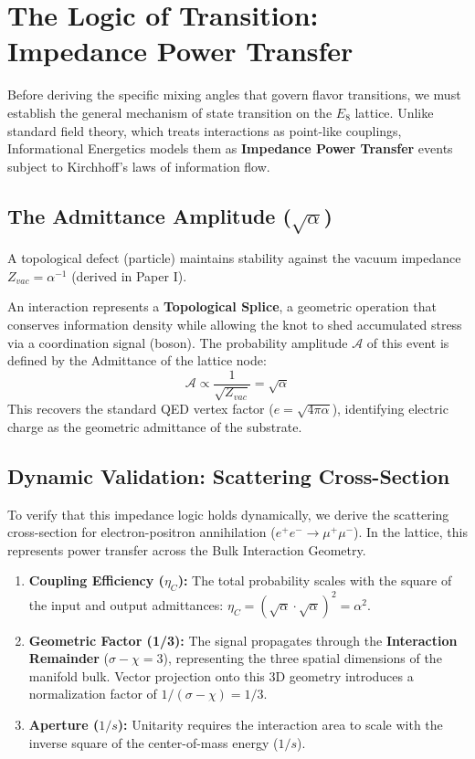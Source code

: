\section{The Logic of Transition: Impedance Power Transfer}

Before deriving the specific mixing angles that govern flavor transitions, we must establish the general mechanism of state transition on the $E_8$ lattice. Unlike standard field theory, which treats interactions as point-like couplings, Informational Energetics models them as \textbf{Impedance Power Transfer} events subject to Kirchhoff's laws of information flow.

\subsection{The Admittance Amplitude (\texorpdfstring{$\sqrt{\alpha}$}{sqrtalpha})}
A topological defect (particle) maintains stability against the vacuum impedance $Z_{vac} = \alpha^{-1}$ (derived in Paper I). 

An interaction represents a \textbf{Topological Splice}, a geometric operation that conserves information density while allowing the knot to shed accumulated stress via a coordination signal (boson). The probability amplitude $\mathcal{A}$ of this event is defined by the Admittance of the lattice node:
\begin{equation}
\mathcal{A} \propto \frac{1}{\sqrt{Z_{vac}}} = \sqrt{\alpha}
\end{equation}
This recovers the standard QED vertex factor ($e = \sqrt{4\pi\alpha}$), identifying electric charge as the geometric admittance of the substrate.

\subsection{Dynamic Validation: Scattering Cross-Section}
To verify that this impedance logic holds dynamically, we derive the scattering cross-section for electron-positron annihilation ($e^+e^- \to \mu^+\mu^-$). In the lattice, this represents power transfer across the Bulk Interaction Geometry.

\begin{enumerate}
    \item \textbf{Coupling Efficiency ($\eta_C$):} The total probability scales with the square of the input and output admittances: $\eta_C = (\sqrt{\alpha} \cdot \sqrt{\alpha})^2 = \alpha^2$.
    \item \textbf{Geometric Factor (1/3):} The signal propagates through the \textbf{Interaction Remainder} ($\sigma - \chi = 3$), representing the three spatial dimensions of the manifold bulk. Vector projection onto this 3D geometry introduces a normalization factor of $1/(\sigma - \chi) = 1/3$.
    \item \textbf{Aperture ($1/s$):} Unitarity requires the interaction area to scale with the inverse square of the center-of-mass energy ($1/s$).
\end{enumerate}

